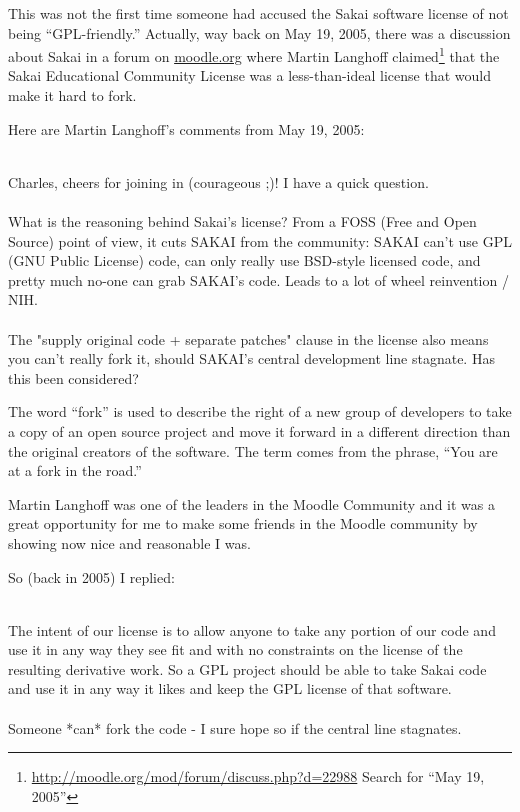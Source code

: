 \documentclass[12pt]{book}
\begin{document}
This was not the first time someone had accused the
Sakai software license of not being ``GPL-friendly.''
Actually, way back on May 19, 2005, there was a
discussion about Sakai in a forum on \url{moodle.org}
where Martin Langhoff claimed\footnote{
\url{http://moodle.org/mod/forum/discuss.php?d=22988}
Search for ``May 19, 2005''} that the Sakai
Educational Community License was a less-than-ideal
license that would make it hard to fork.

Here are Martin Langhoff's comments from May 19, 2005:\\
\\
\begin{sf}
Charles, cheers for joining in (courageous ;)! I
have a quick question. \\
\\
What is the reasoning behind Sakai's license? From a
FOSS (Free and Open Source) point of view, it cuts
SAKAI from the community:
SAKAI can't use GPL (GNU Public License) code, can only really use BSD-style
licensed code, and pretty much no-one can grab SAKAI's
code. Leads to a lot of wheel reinvention / NIH. \\
\\
The "supply original code + separate patches" clause in
the license also means you can't really fork it, should
SAKAI's central development line stagnate. Has this been
considered?\\
\end{sf}

The word ``fork'' is used to describe the right of
a new group of developers to take a copy of an open
source project and move it forward in a different
direction than the original creators of the software.
The term comes from the phrase, ``You are at a fork
in the road.''

Martin Langhoff was one of the leaders in the Moodle
Community and it was a great opportunity for me to
make some friends in the Moodle community by showing
now nice and reasonable I was.

So (back in 2005) I replied:\\
\\
\begin{sf}
The intent of our license is to allow anyone to take any
portion of our code and use it in any way they see fit
and with no constraints on the license of the resulting
derivative work. So a GPL project should be able to take
Sakai code and use it in any way it likes and keep the
GPL license of that software.\\
\\
Someone *can* fork the code - I sure hope so if the
central line stagnates. \\
\end{sf}
\end{document}
